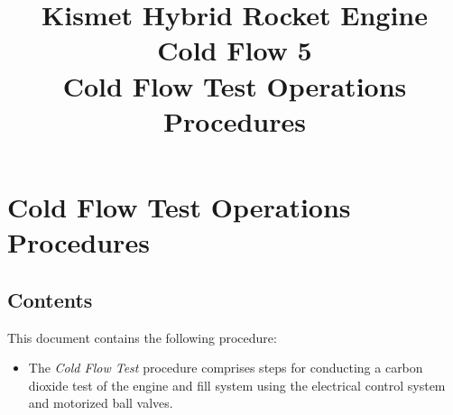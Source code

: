 

\title{
\Huge Kismet Hybrid Rocket Engine\\
Cold Flow 5\\
\vspace{1cm}
\Large Cold Flow Test Operations Procedures}





\section{Cold Flow Test Operations Procedures}

\subsection{Contents}
This document contains the following procedure:
\begin{itemize}
    \item The \textit{Cold Flow Test} procedure comprises steps for conducting a carbon dioxide test of the engine and fill system using the electrical control system and motorized ball valves.
\end{itemize}

